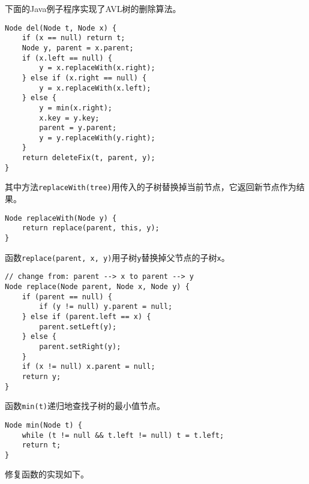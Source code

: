 \documentclass[UTF8]{article}
\begin{document}
下面的Java例子程序实现了AVL树的删除算法。

\lstset{language=Java}
\begin{lstlisting}
Node del(Node t, Node x) {
    if (x == null) return t;
    Node y, parent = x.parent;
    if (x.left == null) {
        y = x.replaceWith(x.right);
    } else if (x.right == null) {
        y = x.replaceWith(x.left);
    } else {
        y = min(x.right);
        x.key = y.key;
        parent = y.parent;
        y = y.replaceWith(y.right);
    }
    return deleteFix(t, parent, y);
}
\end{lstlisting}

其中方法\texttt{replaceWith(tree)}用传入的子树替换掉当前节点，它返回新节点作为结果。

\begin{lstlisting}
Node replaceWith(Node y) {
    return replace(parent, this, y);
}
\end{lstlisting}

函数\texttt{replace(parent, x, y)}用子树\texttt{y}替换掉父节点的子树\texttt{x}。

\begin{lstlisting}
// change from: parent --> x to parent --> y
Node replace(Node parent, Node x, Node y) {
    if (parent == null) {
        if (y != null) y.parent = null;
    } else if (parent.left == x) {
        parent.setLeft(y);
    } else {
        parent.setRight(y);
    }
    if (x != null) x.parent = null;
    return y;
}
\end{lstlisting}

函数\texttt{min(t)}递归地查找子树的最小值节点。

\begin{lstlisting}
Node min(Node t) {
    while (t != null && t.left != null) t = t.left;
    return t;
}
\end{lstlisting}

修复函数的实现如下。
\end{document}
